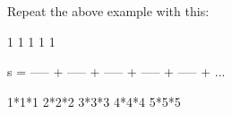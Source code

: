 Repeat the above example with this:

\begin{console}

      1       1       1       1       1

s = ----- + ----- + ----- + ----- + ----- + ...

    1*1*1   2*2*2   3*3*3   4*4*4   5*5*5

\end{console}

